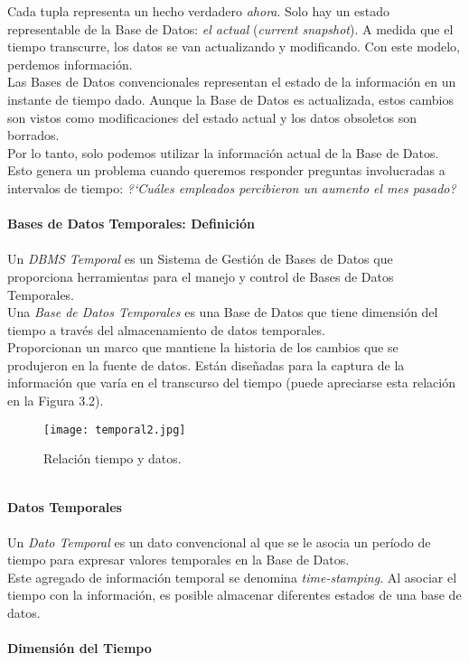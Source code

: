 \documentclass[a4paper,12pt,oneside]{report}
\begin{document}
Cada tupla representa un hecho verdadero \textit{ahora}. Solo hay un estado representable de la Base de Datos: \textit{el actual} (\textit{current snapshot}).
A medida que el tiempo transcurre, los datos se van actualizando y modificando. Con este modelo, perdemos informaci\'on.\\
Las Bases de Datos convencionales representan el estado de la informaci\'on en un instante de tiempo dado. Aunque la Base de Datos es actualizada, estos cambios son vistos como modificaciones del estado actual y los datos obsoletos son borrados.\\
Por lo tanto, solo podemos utilizar la informaci\'on actual de la Base de Datos.\\
Esto genera un problema cuando queremos responder preguntas involucradas a intervalos de tiempo: \textit{?`Cu\'ales empleados percibieron un aumento el mes pasado?}\\
\ \\
\textbf{Bases de Datos Temporales: Definici\'on}\\
\ \\
Un \textit{DBMS Temporal} es un Sistema de Gesti\'on de Bases de Datos que proporciona herramientas para el manejo y control de Bases de Datos Temporales.\\
Una \textit{Base de Datos Temporales} es una Base de Datos que tiene dimensi\'on del tiempo a trav\'es del almacenamiento de datos temporales.\\ Proporcionan un marco que mantiene la historia de los cambios que se produjeron en la fuente de datos. Est\'an dise\~nadas para la captura de la informaci\'on que var\'ia en el transcurso del tiempo (puede apreciarse esta relaci\'on en la Figura 3.2).
\begin{figure}[h]
\center \texttt{[image: temporal2.jpg]}
\caption{Relaci\'on tiempo y datos.}
\end{figure}
\ \\
\textbf{Datos Temporales}\\
\ \\
Un \textit{Dato Temporal} es un dato convencional al que se le asocia un per\'iodo de tiempo para expresar valores temporales en la Base de Datos.\\
Este agregado de informaci\'on temporal se denomina \textit{time-stamping}. Al asociar el tiempo con la informaci\'on, es posible almacenar diferentes estados de una base de datos.\\
\ \\
\textbf{Dimensi\'on del Tiempo}\\
\end{document}
